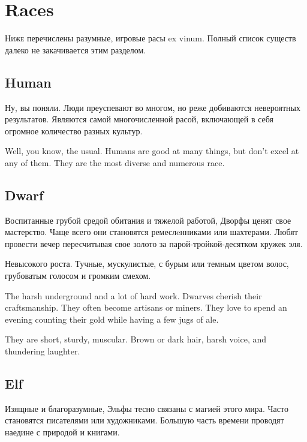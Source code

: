 \documentclass[a5paper,11pt]{book}
\begin{document}
\pagebreak
\chapter{Races}
\begin{multicols}{2}

\begin{ru}
\lettrine{Н}{иже} перечислены разумные, игровые расы ex vinum. Полный список существ далеко не закачивается этим разделом.
\end{ru}

\section{Human}
\begin{ru}
Ну, вы поняли. Люди преуспевают во многом, но реже добиваются невероятных результатов. Являются самой многочисленной расой, включающей в себя огромное количество разных культур.
\end{ru}

\begin{en}
Well, you know, the usual. Humans are good at many things, but don't excel at any of them. They are the most diverse and numerous race.
\end{en}

\section{Dwarf}
\begin{ru}
Воспитанные грубой средой обитания и тяжелой работой, Дворфы ценят свое мастерство. Чаще всего они становятся ремеслeнниками или шахтерами. Любят провести вечер пересчитывая свое золото за парой-тройкой-десятком кружек эля.

Невысокого роста. Тучные, мускулистые, с бурым или темным цветом волос, грубоватым голосом и громким смехом.
\end{ru}

\begin{en}
The harsh underground and a lot of hard work. Dwarves cherish their craftsmanship. They often become artisans or miners. They love to spend an evening counting their gold while having a few jugs of ale.

They are short, sturdy, muscular. Brown or dark hair, harsh voice, and thundering laughter.
\end{en}

\section{Elf}
\begin{ru}
Изящные и благоразумные, Эльфы тесно связаны с магией этого мира. Часто становятся писателями или художниками. Большую часть времени проводят наедине с природой и книгами.


\end{ru}
\end{multicols}
\end{document}
